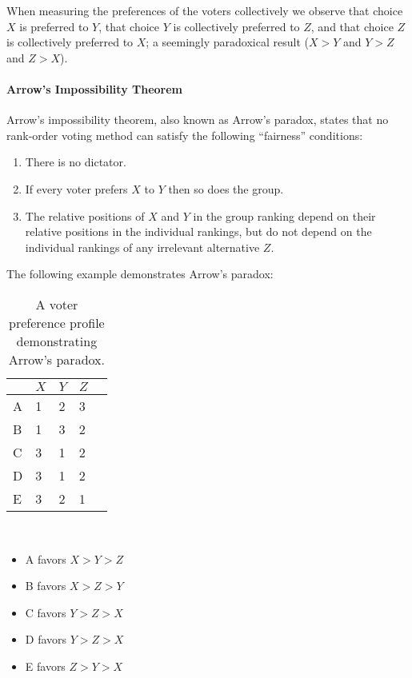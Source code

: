 When measuring the preferences of the voters collectively we observe that choice
$X$ is preferred to $Y$, that choice $Y$ is collectively preferred to $Z$, and
that choice $Z$ is collectively preferred to $X$; a seemingly paradoxical result
($X > Y$ and $Y > Z$ and $Z > X$).

\paragraph{Arrow's Impossibility Theorem}
Arrow's impossibility theorem, also known as Arrow's paradox, states that no
rank-order voting method can satisfy the following ``fairness'' conditions:

\begin{enumerate}
    \item There is no dictator.
    \item If every voter prefers $X$ to $Y$ then so does the group.
    \item The relative positions of $X$ and $Y$ in the group ranking depend on
        their relative positions in the individual rankings, but do not
        depend on the individual rankings of any irrelevant alternative $Z$.
\end{enumerate}

The following example demonstrates Arrow's paradox:

\begin{center}
    \begin{table}[H]
        \centering\scriptsize
        \caption{A voter preference profile demonstrating Arrow's paradox.}
        \label{tab:arrows-paradox}
        \begin{tabu} to 30mm{@{} X[c] | X[c] X[c] X[c] X[c] @{}}
            \toprule
            & $X$ & $Y$ & $Z$ \\
            \midrule
            A & 1 & 2 & 3 \\
            B & 1 & 3 & 2 \\
            C & 3 & 1 & 2 \\
            D & 3 & 1 & 2 \\
            E & 3 & 2 & 1 \\
            \bottomrule
        \end{tabu} \\[2mm]
        \begin{varwidth}{\textwidth}
            \begin{itemize}[label=,leftmargin=0mm,topsep=5mm]
                \item A favors $X > Y > Z$
                \item B favors $X > Z > Y$
                \item C favors $Y > Z > X$
                \item D favors $Y > Z > X$
                \item E favors $Z > Y > X$
            \end{itemize}
        \end{varwidth}
    \end{table}
\end{center}

